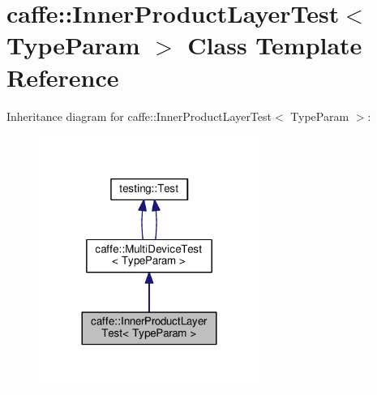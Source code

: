 \hypertarget{classcaffe_1_1_inner_product_layer_test}{}\section{caffe\+:\+:Inner\+Product\+Layer\+Test$<$ Type\+Param $>$ Class Template Reference}
\label{classcaffe_1_1_inner_product_layer_test}


Inheritance diagram for caffe\+:\+:Inner\+Product\+Layer\+Test$<$ Type\+Param $>$\+:
\nopagebreak
\begin{figure}[H]
\begin{center}
\leavevmode
\includegraphics[width=204pt]{classcaffe_1_1_inner_product_layer_test__inherit__graph}
\end{center}
\end{figure}
